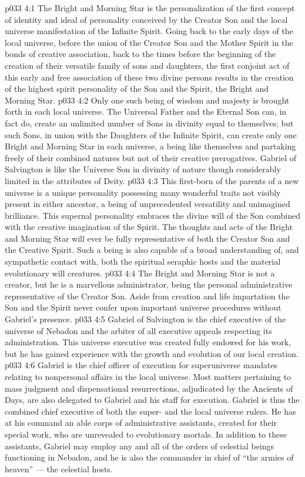 \vs p033 4:1 The Bright and Morning Star is the personalization of the first concept of identity and ideal of personality conceived by the Creator Son and the local universe manifestation of the Infinite Spirit. Going back to the early days of the local universe, before the union of the Creator Son and the Mother Spirit in the bonds of creative association, back to the times before the beginning of the creation of their versatile family of sons and daughters, the first conjoint act of this early and free association of these two divine persons results in the creation of the highest spirit personality of the Son and the Spirit, the Bright and Morning Star.
\vs p033 4:2 Only one such being of wisdom and majesty is brought forth in each local universe. The Universal Father and the Eternal Son can, in fact do, create an unlimited number of Sons in divinity equal to themselves; but such Sons, in union with the Daughters of the Infinite Spirit, can create only one Bright and Morning Star in each universe, a being like themselves and partaking freely of their combined natures but not of their creative prerogatives. Gabriel of Salvington is like the Universe Son in divinity of nature though considerably limited in the attributes of Deity.
\vs p033 4:3 This first\hyp{}born of the parents of a new universe is a unique personality possessing many wonderful traits not visibly present in either ancestor, a being of unprecedented versatility and unimagined brilliance. This supernal personality embraces the divine will of the Son combined with the creative imagination of the Spirit. The thoughts and acts of the Bright and Morning Star will ever be fully representative of both the Creator Son and the Creative Spirit. Such a being is also capable of a broad understanding of, and sympathetic contact with, both the spiritual seraphic hosts and the material evolutionary will creatures.
\vs p033 4:4 \pc The Bright and Morning Star is not a creator, but he is a marvellous administrator, being the personal administrative representative of the Creator Son. Aside from creation and life impartation the Son and the Spirit never confer upon important universe procedures without Gabriel’s presence.
\vs p033 4:5 Gabriel of Salvington is the chief executive of the universe of Nebadon and the arbiter of all executive appeals respecting its administration. This universe executive was created fully endowed for his work, but he has gained experience with the growth and evolution of our local creation.
\vs p033 4:6 Gabriel is the chief officer of execution for superuniverse mandates relating to nonpersonal affairs in the local universe. Most matters pertaining to mass judgment and dispensational resurrections, adjudicated by the Ancients of Days, are also delegated to Gabriel and his staff for execution. Gabriel is thus the combined chief executive of both the super\hyp{} and the local universe rulers. He has at his command an able corps of administrative assistants, created for their special work, who are unrevealed to evolutionary mortals. In addition to these assistants, Gabriel may employ any and all of the orders of celestial beings functioning in Nebadon, and he is also the commander in chief of “the armies of heaven” --- the celestial hosts.
